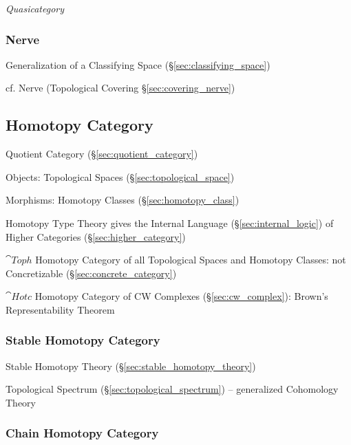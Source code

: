 \emph{Quasicategory}



\subsubsection{Nerve}\label{sec:nerve}

Generalization of a Classifying Space (\S\ref{sec:classifying_space})

cf. Nerve (Topological Covering \S\ref{sec:covering_nerve})



\subsection{Homotopy Category}\label{sec:homotopy_category}

Quotient Category (\S\ref{sec:quotient_category})

Objects: Topological Spaces (\S\ref{sec:topological_space})

Morphisms: Homotopy Classes (\S\ref{sec:homotopy_class})

Homotopy Type Theory gives the Internal Language
(\S\ref{sec:internal_logic}) of Higher Categories
(\S\ref{sec:higher_category})

$\cat{Toph}$ Homotopy Category of all Topological Spaces and Homotopy
Classes: not Concretizable (\S\ref{sec:concrete_category})

$\cat{Hotc}$ Homotopy Category of CW Complexes
(\S\ref{sec:cw_complex}): Brown's Representability Theorem



\subsubsection{Stable Homotopy Category}\label{sec:stable_homotopy_category}

Stable Homotopy Theory (\S\ref{sec:stable_homotopy_theory})

Topological Spectrum (\S\ref{sec:topological_spectrum}) -- generalized
Cohomology Theory



\subsubsection{Chain Homotopy Category}\label{sec:chain_homotopy_category}


